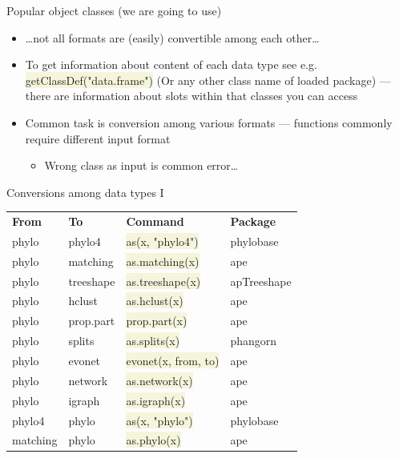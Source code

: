 \documentclass[compress, xelatex, 11pt, xcolor=svgnames, aspectratio=169,
	hyperref={
		bookmarks=true,
		unicode=true,
		colorlinks=true,
		pdftitle={Molecular data in R},
		plainpages=false,
		pdfauthor={Vojtech Zeisek},
		pdfsubject={Course about phylogeny and evolution in R},
		pdfcreator={XeLaTeX},
		pdfkeywords={R, evolution, phylogeny, molecular data},
		linkcolor=Crimson, %
		anchorcolor=Magenta, %
		citecolor=Magenta, %
		filecolor=Magenta, %
		menucolor=Magenta, %
		urlcolor=DodgerBlue, %
		},
	url={hyphens, lowtilde} %
	]{beamer}
\renewcommand{\texttt}[1]{\colorbox{Beige}{{\ttfamily #1}}}
\begin{document}
\begin{frame}[allowframebreaks]{Popular object classes (we are going to use)}
\begin{itemize}
		\item \ldots not all formats are (easily) convertible among each other\ldots
		\item To get information about content of each data type see e.g. \texttt{getClassDef("data.frame")} (Or any other class name of loaded package) --- there are information about slots within that classes you can access
		\item Common task is conversion among various formats --- functions commonly require different input format
		\begin{itemize}
			\item Wrong class as input is common error\ldots
		\end{itemize}
	\end{itemize}
\end{frame}

\begin{frame}{Conversions among data types I}
	\begin{tabular}{llll}
		\textbf{From} & \textbf{To} & \textbf{Command} & \textbf{Package}\\
		phylo & phylo4 & \texttt{as(x, "phylo4")} & phylobase\\
		phylo & matching & \texttt{as.matching(x)} & ape\\
		phylo & treeshape & \texttt{as.treeshape(x)} & apTreeshape\\
		phylo & hclust & \texttt{as.hclust(x)} & ape\\
		phylo & prop.part & \texttt{prop.part(x)} & ape\\
		phylo & splits & \texttt{as.splits(x)} & phangorn\\
		phylo & evonet & \texttt{evonet(x, from, to)} & ape\\
		phylo & network & \texttt{as.network(x)} & ape\\
		phylo & igraph & \texttt{as.igraph(x)} & ape\\
		phylo4 & phylo & \texttt{as(x, "phylo")} & phylobase\\
		matching & phylo & \texttt{as.phylo(x)} & ape
	\end{tabular}
\end{frame}
\end{document}
